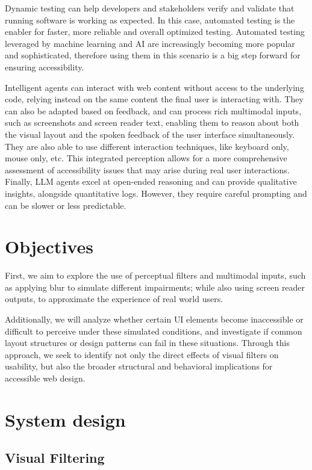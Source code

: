Dynamic testing can help developers and stakeholders verify and validate that running software is working as expected. In this case, automated testing is the enabler for faster, more reliable and overall optimized testing. Automated testing leveraged by machine learning and \ac{AI} are increasingly becoming more popular and sophisticated, therefore using them in this scenario is a big step forward for ensuring accessibility. %

Intelligent agents can interact with web content without access to the underlying code, relying instead on the same content the final user is interacting with\cite{lanham2025ai, wang2024survey, lu2025uxagent}. They can also be adapted based on feedback, and can process rich multimodal inputs, such as screenshots and screen reader text, enabling them to reason about both the visual layout and the spoken feedback of the user interface simultaneously. They are also able to use different interaction techniques, like keyboard only, mouse only, etc. This integrated perception allows for a more comprehensive assessment of accessibility issues that may arise during real user interactions. Finally, LLM agents excel at open-ended reasoning and can provide qualitative insights, alongside quantitative logs. However, they require careful prompting and can be slower or less predictable.


\section{Objectives}

First, we aim to explore the use of perceptual filters and multimodal inputs, such as applying blur to simulate different impairments; while also using screen reader outputs, to approximate the experience of real world users. 

Additionally, we will analyze whether certain \ac{UI} elements become inaccessible or difficult to perceive under these simulated conditions, and investigate if common layout structures or design patterns can fail in these situations. Through this approach, we seek to identify not only the direct effects of visual filters on usability, but also the broader structural and behavioral implications for accessible web design.

\section{System design}
\subsection{Visual Filtering}

